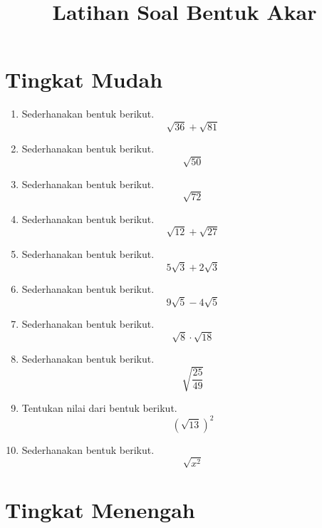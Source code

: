 \documentclass[12pt,a4paper]{article}
\title{Latihan Soal Bentuk Akar}
\author{}
\date{}
\begin{document}
	
	\maketitle
	
	\section*{Tingkat Mudah}
	
	\begin{enumerate}[label=\arabic*.]
		
		\item Sederhanakan bentuk berikut.
		\[
		\sqrt{36}+\sqrt{81}
		\]
		
		\item Sederhanakan bentuk berikut.
		\[
		\sqrt{50}
		\]
		
		\item Sederhanakan bentuk berikut.
		\[
		\sqrt{72}
		\]
		
		\item Sederhanakan bentuk berikut.
		\[
		\sqrt{12}+\sqrt{27}
		\]
		
		\item Sederhanakan bentuk berikut.
		\[
		5\sqrt{3}+2\sqrt{3}
		\]
		
		\item Sederhanakan bentuk berikut.
		\[
		9\sqrt{5}-4\sqrt{5}
		\]
		
		\item Sederhanakan bentuk berikut.
		\[
		\sqrt{8}\cdot\sqrt{18}
		\]
		
		\item Sederhanakan bentuk berikut.
		\[
		\sqrt{\frac{25}{49}}
		\]
		
		\item Tentukan nilai dari bentuk berikut.
		\[
		(\sqrt{13})^2
		\]
		
		\item Sederhanakan bentuk berikut.
		\[
		\sqrt{x^2}
		\]
		
	\end{enumerate}
	
	\section*{Tingkat Menengah}
	
\end{document}
